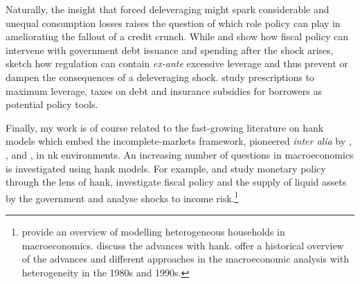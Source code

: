 \documentclass[12pt]{article} %
\numberwithin{equation}{section} %
\begin{document}
Naturally, the insight that forced deleveraging might spark considerable and unequal consumption losses raises the question of which role policy can play in ameliorating the fallout of a credit crunch. While \textcite{egg2012} and \textcite{gl2017} show how fiscal policy can intervene with government debt issuance and spending after the shock arises, \textcite{korinek2016} sketch how regulation can contain \textit{ex-ante} excessive leverage and thus prevent or dampen the consequences of a deleveraging shock. \textcite{korinek2016} study prescriptions to maximum leverage, taxes on debt and insurance subsidies for borrowers as potential policy tools.

Finally, my work is of course related to the fast-growing literature on \Gls{hank} models which embed the incomplete-markets framework, pioneered \textit{inter alia} by \textcite{bewley1986}, \textcite{im1989}, \textcite{huggett1993} and \textcite{aiyagari1994}, in \Gls{nk} environments. An increasing number of questions in macroeconomics is investigated using \Gls{hank} models. For example, \textcite{mckay2016} and \textcite{kaplan2018} study monetary policy through the lens of \Gls{hank}, \textcite{bayer2023} investigate fiscal policy and the supply of liquid assets by the government and \textcite{bayer2019} analyse shocks to income risk.\footnote{\textcite{heath2009} provide an overview of modelling heterogeneous households in macroeconomics. \textcite{kv2018} discuss the advances with \Gls{hank}. \textcite{cherrier2023} offer a historical overview of the advances and different approaches in the macroeconomic analysis with heterogeneity in the 1980s and 1990s.}


\end{document}
